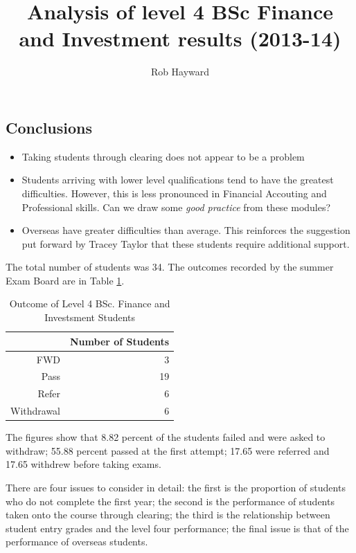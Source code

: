 \documentclass[12pt, a4paper, oneside]{article}\usepackage[]{graphicx}\usepackage[]{color}
\begin{document}
\title{Analysis of level 4 BSc Finance and Investment results (2013-14)}
\author{Rob Hayward}
\maketitle

\subsection*{Conclusions}
\begin{itemize}
\item Taking students through clearing does not appear to be a problem
\item Students arriving with lower level qualifications tend to have the greatest difficulties.  However, this is less pronounced in Financial Accouting and Professional skills.  Can we draw some \emph{good practice} from these modules?
\item Overseas have greater difficulties than average.  This reinforces the suggestion put forward by Tracey Taylor that these students require additional support. 
\end{itemize}

The total number of students was 34.  The outcomes recorded by the summer Exam Board are in Table \ref{tabref:out}.  

\begin{table}[ht]
\centering
\begin{tabular}{rr}
  \hline
 & Number of Students \\ 
  \hline
FWD &   3 \\ 
  Pass &  19 \\ 
  Refer &   6 \\ 
  Withdrawal &   6 \\ 
   \hline
\end{tabular}
\caption{Outcome of Level 4 BSc. Finance and Investsment Students} 
\label{tabref:out}
\end{table}

The figures show that 8.82 percent of the students failed and were asked to withdraw;  55.88 percent passed at the first attempt; 17.65 were referred and 17.65 withdrew before taking exams.  

There are four issues to consider in detail: the first is the proportion of students who do not complete the first year; the second is the performance of students taken onto the course through clearing; the third is the relationship between student entry grades and the level four performance; the final issue is that of the performance of overseas students. 
\end{document}
